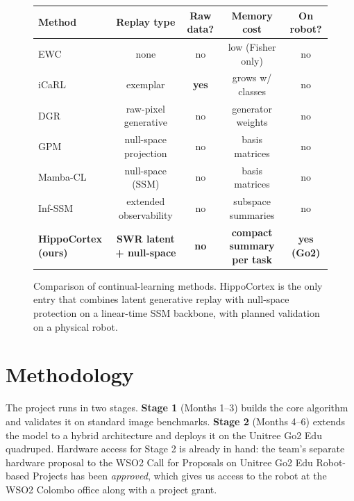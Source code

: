 \documentclass[11pt,a4paper]{article}
\begin{document}
\begin{figure}[ht]
\centering
\footnotesize
\setlength{\tabcolsep}{4pt}
\begin{tabular*}{\linewidth}{@{\extracolsep{\fill}}lcccc@{}}
\toprule
\textbf{Method} & \textbf{Replay type} & \textbf{Raw data?} & \textbf{Memory cost} & \textbf{On robot?} \\
\midrule
EWC~\citep{kirkpatrick2017overcoming}              & none                    & no            & low (Fisher only)   & no \\
iCaRL~\citep{rebuffi2017icarl}                     & exemplar                & \textbf{yes}  & grows w/ classes    & no \\
DGR~\citep{shin2017continual}                      & raw-pixel generative    & no            & generator weights   & no \\
GPM~\citep{saha2021gradient}                       & null-space projection   & no            & basis matrices      & no \\
Mamba-CL~\citep{cheng2024mambacl}                  & null-space (SSM)        & no            & basis matrices      & no \\
Inf-SSM~\citep{lee2025exemplarfree}                & extended observability  & no            & subspace summaries  & no \\
\rowcolor{nodegreen}\textbf{\color{neuroblue}HippoCortex (ours)}  & \textbf{\color{neuroblue}SWR latent + null-space} & \textbf{\color{neuroblue}no} & \textbf{\color{neuroblue}compact summary per task} & \textbf{\color{neuroblue}yes (Go2)} \\
\bottomrule
\end{tabular*}
\caption{Comparison of continual-learning methods. HippoCortex is the only entry that combines latent generative replay with null-space protection on a linear-time SSM backbone, with planned validation on a physical robot.}
\label{fig:methodtable}
\end{figure}

\section{Methodology}

The project runs in two stages. \textbf{Stage 1} (Months 1--3) builds the core algorithm and validates it on standard image benchmarks. \textbf{Stage 2} (Months 4--6) extends the model to a hybrid architecture and deploys it on the Unitree Go2 Edu quadruped. Hardware access for Stage 2 is already in hand: the team's separate hardware proposal to the WSO2 Call for Proposals on Unitree Go2 Edu Robot-based Projects has been \emph{approved}, which gives us access to the robot at the WSO2 Colombo office along with a project grant.
\end{document}
